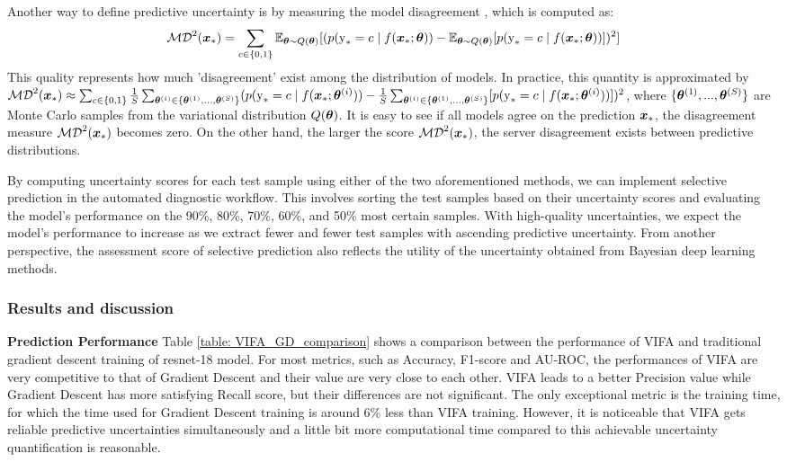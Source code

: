 \documentclass[10pt]{article} %
\begin{document}
Another way to define predictive uncertainty is by measuring the model disagreement \citep{d2021repulsive}, which is computed as:
\begin{equation}
    \mathcal{MD}^2 ({\bm{x}}_*) = \sum_{c \in\{0,1\}} \mathbb{E}_{{\bm{\theta}} \sim Q({\bm{\theta}})}[(p({\textnormal{y}}_*=c \mid f({\bm{x}}_*; {\bm{\theta}})) - \mathbb{E}_{{\bm{\theta}} \sim Q({\bm{\theta}})}[p({\textnormal{y}}_* = c\mid f({\bm{x}}_* ; {\bm{\theta}}))])^2]
\end{equation}
This quality represents how much 'disagreement' exist among the distribution of models. In practice, this quantity is approximated by $\mathcal{MD}^2({\bm{x}}_*) \approx \sum_{c \in\{0,1\}} \frac{1}{S}\sum_{{\bm{\theta}}^{(i)} \in\{{\bm{\theta}}^{(1)},...,{\bm{\theta}}^{(S)}\}} (p({\textnormal{y}}_*=c \mid f({\bm{x}}_*; {\bm{\theta}}^{(i)})) - \frac{1}{S}\sum_{{\bm{\theta}}^{(i)} \in\{{\bm{\theta}}^{(1)},...,{\bm{\theta}}^{(S)}\}}[p({\textnormal{y}}_* = c\mid f({\bm{x}}_* ; {\bm{\theta}}^{(i)}))])^2$, where $\{{\bm{\theta}}^{(1)},...,{\bm{\theta}}^{(S)}\}$ are Monte Carlo samples from the variational distribution $Q({\bm{\theta}})$. It is easy to see if all models agree on the prediction ${\bm{x}}_*$, the disagreement measure $\mathcal{MD}^2 ({\bm{x}}_*)$ becomes zero. On the other hand, the larger the score $\mathcal{MD}^2 ({\bm{x}}_*)$, the server disagreement exists between predictive distributions.

By computing uncertainty scores for each test sample using either of the two aforementioned methods, we can implement selective prediction in the automated diagnostic workflow. This involves sorting the test samples based on their uncertainty scores and evaluating the model's performance on the 90\%, 80\%, 70\%, 60\%, and 50\% most certain samples. With high-quality uncertainties, we expect the model's performance to increase as we extract fewer and fewer test samples with ascending predictive uncertainty. From another perspective, the assessment score of selective prediction also reflects the utility of the uncertainty obtained from Bayesian deep learning methods.


\subsubsection{Results and discussion}

\textbf{Prediction Performance}
Table \ref{table: VIFA_GD_comparison} shows a comparison between the performance of VIFA and traditional gradient descent training of resnet-18 model. For most metrics, such as Accuracy, F1-score and AU-ROC, the performances of VIFA are very competitive to that of Gradient Descent and their value are very close to each other. VIFA leads to a better Precision value while Gradient Descent has more satisfying Recall score, but their differences are not significant. The only exceptional metric is the training time, for which the time used for Gradient Descent training is around 6\% less than VIFA training. However, it is noticeable that VIFA gets reliable predictive uncertainties simultaneously and a little bit more computational time compared to this achievable uncertainty quantification is reasonable. 
\end{document}
